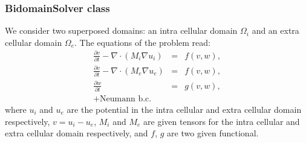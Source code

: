 \documentclass[11pt]{article}
\begin{document}
\subsubsection{BidomainSolver class}
We consider two superposed domains: an intra cellular domain $\Omega_i$ and an extra cellular domain $\Omega_e$. The equations of the problem read:
\begin{eqnarray}
\frac{\partial v}{\partial t} - \nabla\cdot(M_i\nabla u_i) & = & f(v,w),\\
\frac{\partial v}{\partial t} - \nabla\cdot(M_e\nabla u_e) & = & f(v,w),\\
\frac{\partial w}{\partial t} & = & g(v,w),\\
+ \text{Neumann b.c.}\nonumber
\end{eqnarray}
where $u_i$ and $u_e$ are the potential in the intra cellular and extra cellular domain respectively, $v=u_i-u_e$, $M_i$ and $M_e$ are given tensors for the  intra cellular and extra cellular domain respectively, and $f$, $g$ are two given functional.
\end{document}
